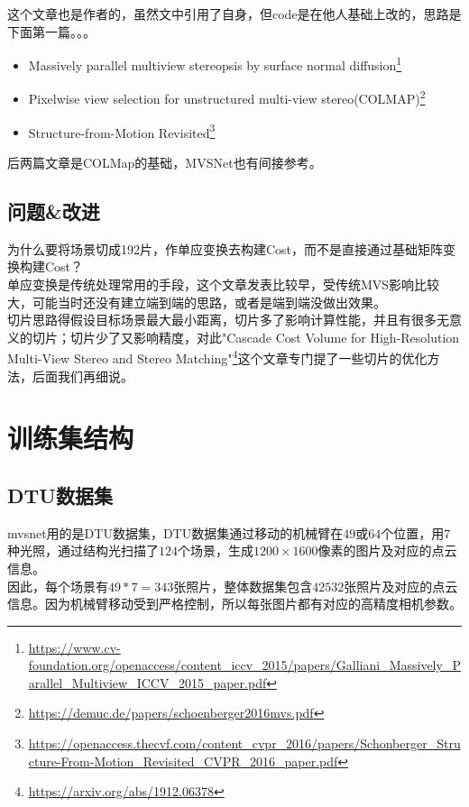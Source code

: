 	这个文章也是作者的，虽然文中引用了自身，但code是在他人基础上改的，思路是下面第一篇。。。

	\begin{itemize}
		\item  Massively parallel multiview stereopsis by surface normal diffusion\footnote{\url{https://www.cv-foundation.org/openaccess/content_iccv_2015/papers/Galliani_Massively_Parallel_Multiview_ICCV_2015_paper.pdf}}
		\item Pixelwise view selection for unstructured multi-view stereo(COLMAP)\footnote{\url{https://demuc.de/papers/schoenberger2016mvs.pdf}}
		\item Structure-from-Motion Revisited\footnote{\url{https://openaccess.thecvf.com/content_cvpr_2016/papers/Schonberger_Structure-From-Motion_Revisited_CVPR_2016_paper.pdf}}
	\end{itemize}

	后两篇文章是COLMap的基础，MVSNet也有间接参考。

\subsection{问题\&改进}
	为什么要将场景切成192片，作单应变换去构建Cost，而不是直接通过基础矩阵变换构建Cost？\\

	单应变换是传统处理常用的手段，这个文章发表比较早，受传统MVS影响比较大，可能当时还没有建立端到端的思路，或者是端到端没做出效果。\\

	切片思路得假设目标场景最大最小距离，切片多了影响计算性能，并且有很多无意义的切片；切片少了又影响精度，对此"Cascade Cost Volume for High-Resolution Multi-View Stereo and Stereo Matching"\footnote{\url{https://arxiv.org/abs/1912.06378}}这个文章专门提了一些切片的优化方法，后面我们再细说。

\section{训练集结构}
	
	\subsection*{DTU数据集} 
		mvsnet用的是DTU数据集，DTU数据集通过移动的机械臂在$49$或$64$个位置，用$7$种光照，通过结构光扫描了$124$个场景，生成$1200 \times 1600$像素的图片及对应的点云信息。\\

		因此，每个场景有$49 * 7 = 343$张照片，整体数据集包含$42532$张照片及对应的点云信息。因为机械臂移动受到严格控制，所以每张图片都有对应的高精度相机参数。\\

